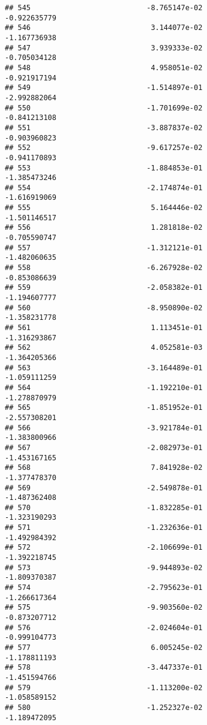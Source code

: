 \documentclass[
]{article}
\begin{document}
\begin{verbatim}
## 545                           -8.765147e-02               -0.922635779
## 546                            3.144077e-02               -1.167736938
## 547                            3.939333e-02               -0.705034128
## 548                            4.958051e-02               -0.921917194
## 549                           -1.514897e-01               -2.992882064
## 550                           -1.701699e-02               -0.841213108
## 551                           -3.887837e-02               -0.903960823
## 552                           -9.617257e-02               -0.941170893
## 553                           -1.884853e-01               -1.385473246
## 554                           -2.174874e-01               -1.616919069
## 555                            5.164446e-02               -1.501146517
## 556                            1.281818e-02               -0.705590747
## 557                           -1.312121e-01               -1.482060635
## 558                           -6.267928e-02               -0.853086639
## 559                           -2.058382e-01               -1.194607777
## 560                           -8.950890e-02               -1.358231778
## 561                            1.113451e-01               -1.316293867
## 562                            4.052581e-03               -1.364205366
## 563                           -3.164489e-01               -1.059111259
## 564                           -1.192210e-01               -1.278870979
## 565                           -1.851952e-01               -2.557308201
## 566                           -3.921784e-01               -1.383800966
## 567                           -2.082973e-01               -1.453167165
## 568                            7.841928e-02               -1.377478370
## 569                           -2.549878e-01               -1.487362408
## 570                           -1.832285e-01               -1.323190293
## 571                           -1.232636e-01               -1.492984392
## 572                           -2.106699e-01               -1.392218745
## 573                           -9.944893e-02               -1.809370387
## 574                           -2.795623e-01               -1.266617364
## 575                           -9.903560e-02               -0.873207712
## 576                           -2.024604e-01               -0.999104773
## 577                            6.005245e-02               -1.178811193
## 578                           -3.447337e-01               -1.451594766
## 579                           -1.113200e-02               -1.058589152
## 580                           -1.252327e-02               -1.189472095

\end{verbatim}
\end{document}
